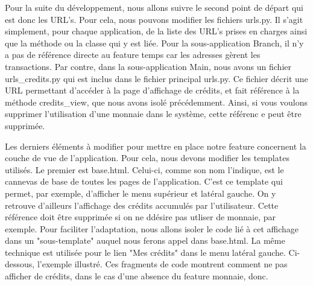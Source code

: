 Pour la suite du développement,  nous allons suivre le second point de départ qui est donc les URL's.  Pour cela,  nous pouvons modifier les fichiers urls.py.  Il s'agit simplement,  pour chaque application,  de la liste des URL's prises en charges ainsi que la méthode ou la classe qui y est liée.  Pour la sous-application Branch,  il n'y a pas de référence directe au feature temps car les adresses gèrent les transactions.  Par contre,  dans la sous-application Main,  nous avons un fichier urls\_credits.py qui est inclus dans le fichier principal urls.py.  Ce fichier décrit une URL permettant d'accéder à la page d'affichage de crédits,  et fait référence à la méthode credits\_view,  que nous avons isolé précédemment.  Ainsi,  si vous voulons supprimer l'utilisation d'une monnaie dans le système,  cette référenc e peut être supprimée.  

Les derniers éléments à modifier pour mettre en place notre feature concernent la couche de vue de l'application.  Pour cela,  nous devons modifier les templates utilisés. Le premier est base.html.  Celui-ci,  comme son nom l'indique,  est le cannevas de base de toutes les pages de l'application.  C'est ce template qui permet,  par exemple,  d'afficher le menu supérieur et latéral gauche.  On y retrouve d'ailleurs l'affichage des crédits accumulés par l'utilisateur.  Cette référence doit être supprimée si on ne ddésire pas utliser de monnaie,  par exemple.  Pour faciliter l'adaptation,  nous allons isoler le code lié à cet affichage dans un "sous-template" auquel nous ferons appel dans base.html.  La même technique est utilisée pour le lien "Mes crédits" dans le menu latéral gauche.  Ci-dessous,  l'exemple illustré.  Ces fragments de code montrent comment ne pas afficher de crédits,  dans le cas d'une absence du feature monnaie,  donc.  


